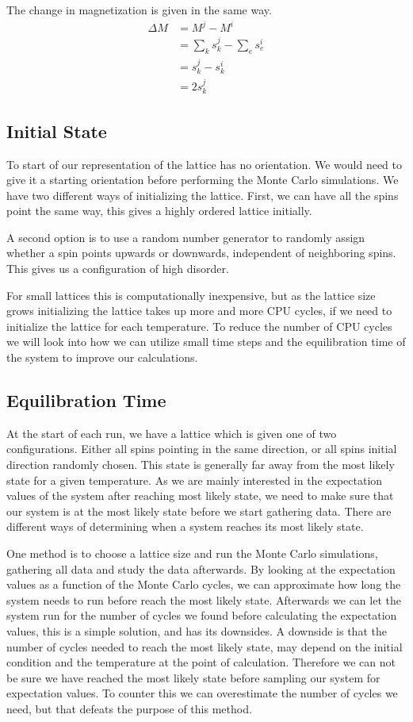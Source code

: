 \documentclass[%
reprint,
nofootinbib,
amsmath,amssymb,
aps,
]{revtex4-1}
\begin{document}
The change in magnetization is given in the same way. 
\begin{align}
	\Delta M &= M^j - M^i\\
	&= \sum_{k}s_k^j - \sum_{e}s_e^i\\
	&= s_k^j - s_k^i \\
	&= 2s_k^j
\end{align}


\subsection{Initial State}
To start of our representation of the lattice has no orientation. We would need to give it a starting orientation before performing the Monte Carlo simulations. We have two different ways of initializing the lattice. First, we can have all the spins point the same way, this gives a highly ordered lattice initially. 

A second option is to use a random number generator to randomly assign whether a spin points upwards or downwards, independent of neighboring spins. This gives us a configuration of high disorder. 

For small lattices this is computationally inexpensive, but as the lattice size grows initializing the lattice takes up more and more CPU cycles, if we need to initialize the lattice for each temperature. To reduce the number of CPU cycles we will look into how we can utilize small time steps and the equilibration time of the system to improve our calculations. 

\subsection{Equilibration Time} %
At the start of each run, we have a lattice which is given one of two configurations. Either all spins pointing in the same direction, or all spins initial direction randomly chosen. This state is generally far away from the most likely state for a given temperature. As we are mainly interested in the expectation values of the system after reaching most likely state, we need to make sure that our system is at the most likely state before we start gathering data. 
There are different ways of determining when a system reaches its most likely state. 

One method is to choose a lattice size and run the Monte Carlo simulations, gathering all data and study the data afterwards. By looking at the expectation values as a function of the Monte Carlo cycles, we can approximate how long the system needs to run before reach the most likely state. Afterwards we can let the system run for the number of cycles we found before calculating the expectation values, this is a simple solution, and has its downsides. A downside is that the number of cycles needed to reach the most likely state, may depend on the initial condition and the temperature at the point of calculation. Therefore we can not be sure we have reached the most likely state before sampling our system for expectation values. To counter this we can overestimate the number of cycles we need, but that defeats the purpose of this method. 
\end{document}
